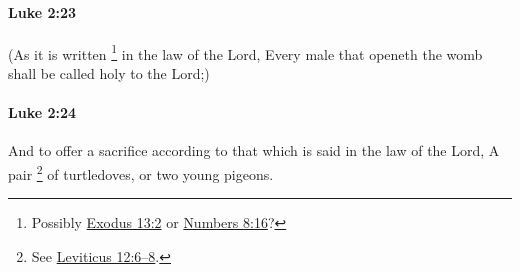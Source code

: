 		\paragraph{Luke 2:23} %
			\label{LUKE-2-23}

			(As it is written%
				\footnote{%
					Possibly \hyperref[EXODUS-13-2]{Exodus 13:2} or \hyperref[NUMBERS-8-16]{Numbers 8:16}?
					}
			in the law of the Lord, Every male that openeth the womb shall be called holy to the Lord;)

			\begin{framed}
			\scriptsize
				\begin{compactdesc}
					\item[SBLG] 
				\end{compactdesc}
			\end{framed}

		\paragraph{Luke 2:24} %
			\label{LUKE-2-24}

			And to offer a sacrifice according to that which is said in the law of the Lord, A pair%
				\footnote{%
					See \hyperref[LEVITICUS-12-6]{Leviticus 12:6--8}.
					}
			of turtledoves, or two young pigeons.

